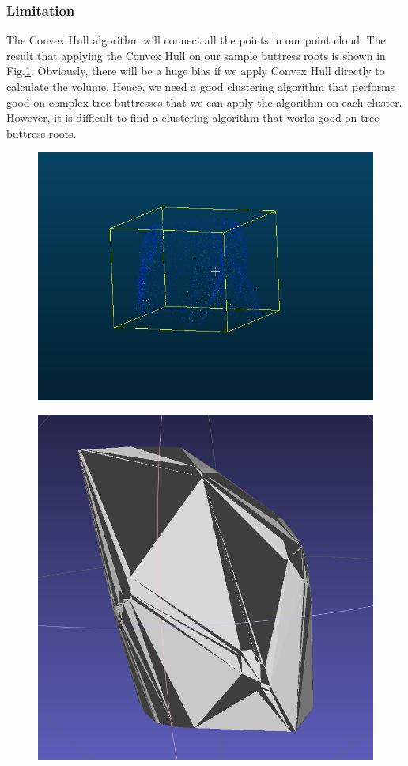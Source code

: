 \documentclass[runningheads,a4paper]{llncs}
\begin{document}
\subsubsection{Limitation}
The Convex Hull algorithm will connect all the points in our point cloud. The result that applying the Convex Hull on our sample buttress roots is shown in Fig.\ref{fig:ConvexHull3}. Obviously, there will be a huge bias if we apply Convex Hull directly to calculate the volume. Hence, we need a good clustering algorithm that performs good on complex tree buttresses that we can apply the algorithm on each cluster. However, it is difficult to find a clustering algorithm that works good on tree buttress roots.
\begin{figure}
\begin{minipage}{.5\textwidth}
  \centering
  \includegraphics[width=1\linewidth]{ikea_buttress_SOR.PNG}
  \label{fig:A sample tree buttress}
\end{minipage}
\begin{minipage}{.5\textwidth}
  \centering
  \includegraphics[width=.7\linewidth]{Convex.PNG}
  \label{fig:ConvexHull3}
\end{minipage}
\end{figure}
\end{document}
